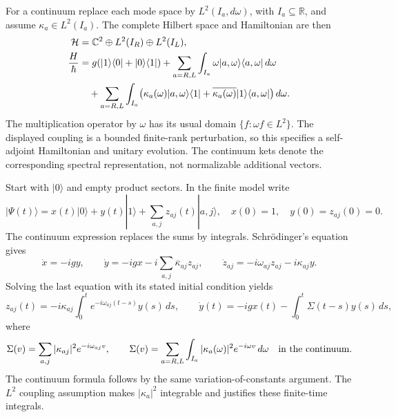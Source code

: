 \documentclass[11pt,oneside,openany]{book}
\theoremstyle{definition}
\theoremstyle{remark}\newtheorem{remark}[theorem]{Remark}
\begin{document}
For a continuum replace each mode space by $L^2(I_a,d\omega)$, with
$I_a\subseteq\mathbb R$, and assume $\kappa_a\in L^2(I_a)$.
The complete Hilbert space and Hamiltonian are then
\begin{align}
 \mathcal H&=\mathbb C^2\oplus L^2(I_R)\oplus L^2(I_L),\notag\\
 \frac{H}{\hbar}
 &=g(|1\rangle\langle0|+|0\rangle\langle1|)
   +\sum_{a=R,L}\int_{I_a}\omega|a,\omega\rangle
                          \langle a,\omega|\,d\omega\notag\\
 &\quad+\sum_{a=R,L}\int_{I_a}
  \bigl(\kappa_a(\omega)|a,\omega\rangle\langle1|
       +\overline{\kappa_a(\omega)}|1\rangle\langle a,\omega|\bigr)
       \,d\omega .
 \label{bench:reservoir-continuumH}
\end{align}
The multiplication operator by $\omega$ has its usual domain
$\{f:\omega f\in L^2\}$. The displayed coupling is a bounded finite-rank
perturbation, so this specifies a self-adjoint Hamiltonian and unitary
evolution. The continuum kets denote the corresponding spectral
representation, not normalizable additional vectors.

Start with $|0\rangle$ and empty product sectors. In the finite model write
\begin{equation}
 |\Psi(t)\rangle=x(t)|0\rangle+y(t)|1\rangle
                  +\sum_{a,j}z_{aj}(t)|a,j\rangle,
 \quad x(0)=1,\quad y(0)=z_{aj}(0)=0.
 \label{bench:reservoir-wave}
\end{equation}
The continuum expression replaces the sums by integrals. Schr\"odinger's
equation gives
\[
 \dot x=-igy,\qquad
 \dot y=-igx-i\sum_{a,j}\overline{\kappa}_{aj}z_{aj},\qquad
 \dot z_{aj}=-i\omega_{aj}z_{aj}-i\kappa_{aj}y.
\]
Solving the last equation with its stated initial condition yields
\begin{equation}
 z_{aj}(t)=-i\kappa_{aj}\int_0^t
            e^{-i\omega_{aj}(t-s)}y(s)\,ds,
 \qquad
 \dot y(t)=-igx(t)-\int_0^t\Sigma(t-s)y(s)\,ds,
 \label{bench:reservoir-kernel}
\end{equation}
where
\begin{equation}
 \Sigma(v)=\sum_{a,j}|\kappa_{aj}|^2e^{-i\omega_{aj}v},
 \qquad
 \Sigma(v)=\sum_{a=R,L}\int_{I_a}|\kappa_a(\omega)|^2
                                      e^{-i\omega v}\,d\omega
 \quad\hbox{in the continuum}.
 \label{bench:reservoir-spectrum}
\end{equation}
The continuum formula follows by the same variation-of-constants
argument. The $L^2$ coupling assumption makes $|\kappa_a|^2$ integrable
and justifies these finite-time integrals.
\end{document}
